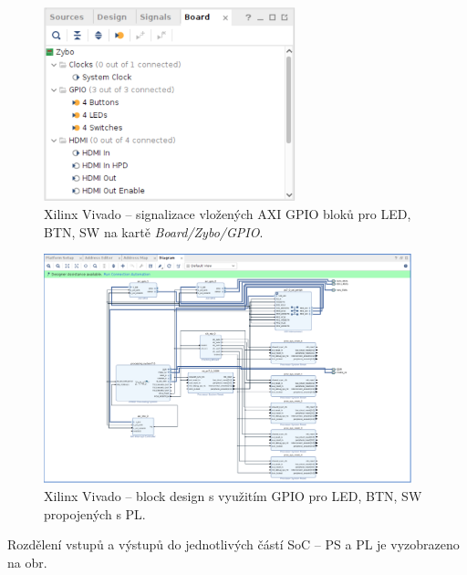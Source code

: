 \documentclass[a4paper, twoside, 11pt]{article}
\begin{document}
		\begin{figure}[htbp!]
			\centering
			\includegraphics[width=0.65\textwidth]{src/png/xilinx-vivado-flow/xilinx-vivado-flow-38.png}
			\caption{Xilinx Vivado – signalizace vložených AXI GPIO bloků pro LED, BTN, SW na kartě \textit{Board/Zybo/GPIO}.}
			\label{fig:xilinx-vivado-flow-38}
		\end{figure}

		\begin{figure}[htbp!]
			\centering
			\includegraphics[width=0.95\textwidth]{src/png/xilinx-vivado-flow/xilinx-vivado-flow-37.png}
			\caption{Xilinx Vivado – block design s využitím GPIO pro LED, BTN, SW propojených s PL.}
			\label{fig:xilinx-vivado-flow-37}
		\end{figure}

		Rozdělení vstupů a výstupů do jednotlivých částí SoC – PS a PL je vyzobrazeno na obr.
\end{document}
